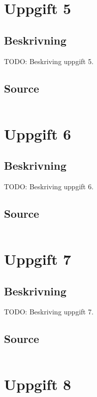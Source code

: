 \documentclass[11pt,a4paper]{article}
\begin{document}
\section{Uppgift 5}\label{uppgift-5}

\subsection{Beskrivning}
TODO: Beskriving uppgift 5.

\subsection{Source}\label{uppgift-5_src}
\inputminted[]{java}{../src/Lab1Uppg05.java}

\section{Uppgift 6}\label{uppgift-6}

\subsection{Beskrivning}
TODO: Beskriving uppgift 6.

\subsection{Source}\label{uppgift-6_src}
\inputminted[]{java}{../src/Lab1Uppg06.java}

\section{Uppgift 7}\label{uppgift-7}

\subsection{Beskrivning}
TODO: Beskriving uppgift 7.

\subsection{Source}\label{uppgift-7_src}
\inputminted[]{java}{../src/Lab1Uppg07.java}

\section{Uppgift 8}\label{uppgift-8}
\end{document}
